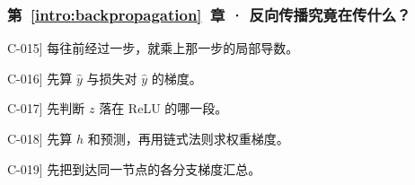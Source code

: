 \subsubsection*{第~\ref*{intro:backpropagation}~章 · 反向传播究竟在传什么？}
\begin{answerhints}
\item[\hyperref[exercise:local-chain-gradient]{C-015}] \leavevmode{}\label{hint:local-chain-gradient}每往前经过一步，就乘上那一步的局部导数。
\item[\hyperref[exercise:branch-gradient-sum]{C-016}] \leavevmode{}\label{hint:branch-gradient-sum}先算 $\widehat{y}$ 与损失对 $\widehat{y}$ 的梯度。
\item[\hyperref[exercise:relu-blocked-gradient]{C-017}] \leavevmode{}\label{hint:relu-blocked-gradient}先判断 $z$ 落在 ReLU 的哪一段。
\item[\hyperref[exercise:scalar-chain-forward]{C-018}] \leavevmode{}\label{hint:scalar-chain-forward}先算 $h$ 和预测，再用链式法则求权重梯度。
\item[\hyperref[exercise:branch-gradient-reuse]{C-019}] \leavevmode{}\label{hint:branch-gradient-reuse}先把到达同一节点的各分支梯度汇总。
\end{answerhints}
